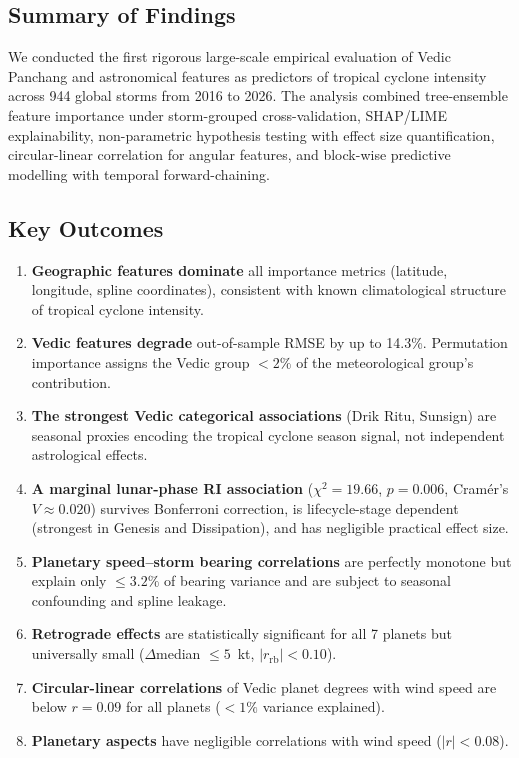\documentclass[12pt,a4paper]{article}
\begin{document}
\subsection{Summary of Findings}

We conducted the first rigorous large-scale empirical evaluation of Vedic
Panchang and astronomical features as predictors of tropical cyclone intensity
across 944 global storms from 2016 to 2026. The analysis combined tree-ensemble
feature importance under storm-grouped cross-validation, SHAP/LIME
explainability, non-parametric hypothesis testing with effect size
quantification, circular-linear correlation for angular features, and
block-wise predictive modelling with temporal forward-chaining.

\subsection{Key Outcomes}

\begin{enumerate}[noitemsep]
  \item \textbf{Geographic features dominate} all importance metrics (latitude,
        longitude, spline coordinates), consistent with known climatological
        structure of tropical cyclone intensity.
  \item \textbf{Vedic features degrade} out-of-sample RMSE by up to 14.3\%.
        Permutation importance assigns the Vedic group $<2\%$ of the
        meteorological group's contribution.
  \item \textbf{The strongest Vedic categorical associations} (Drik Ritu,
        Sunsign) are seasonal proxies encoding the tropical cyclone season
        signal, not independent astrological effects.
  \item \textbf{A marginal lunar-phase RI association} ($\chi^2 = 19.66$,
        $p = 0.006$, Cram\'er's $V \approx 0.020$) survives Bonferroni
        correction, is lifecycle-stage dependent (strongest in Genesis and
        Dissipation), and has negligible practical effect size.
  \item \textbf{Planetary speed--storm bearing correlations} are perfectly
        monotone but explain only $\leq 3.2\%$ of bearing variance and are
        subject to seasonal confounding and spline leakage.
  \item \textbf{Retrograde effects} are statistically significant for all 7
        planets but universally small ($\Delta$median $\leq 5$~kt,
        $|r_{\text{rb}}| < 0.10$).
  \item \textbf{Circular-linear correlations} of Vedic planet degrees with
        wind speed are below $r = 0.09$ for all planets ($< 1\%$ variance
        explained).
  \item \textbf{Planetary aspects} have negligible correlations with wind speed
        ($|r| < 0.08$).
\end{enumerate}
\end{document}
